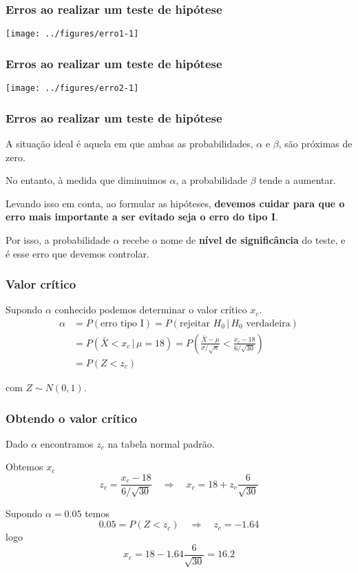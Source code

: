 \documentclass{beamer}
\begin{document}
\begin{frame}
\frametitle{Erros ao realizar um teste de hipótese}

\begin{center}\texttt{[image: ../figures/erro1-1]} \end{center}
\end{frame}

\begin{frame}
\frametitle{Erros ao realizar um teste de hipótese}

\begin{center}\texttt{[image: ../figures/erro2-1]} \end{center}
\end{frame}

\begin{frame}
\frametitle{Erros ao realizar um teste de hipótese}

A situação ideal é aquela em que ambas as probabilidades, \(\alpha\) e
\(\beta\), são próximas de zero.

No entanto, à medida que diminuimos \(\alpha\), a probabilidade
\(\beta\) tende a aumentar.

Levando isso em conta, ao formular as hipóteses, \textbf{devemos cuidar
para que o erro mais importante a ser evitado seja o erro do tipo I}.

Por isso, a probabilidade \(\alpha\) recebe o nome de \textbf{nível de
significância} do teste, e é esse erro que devemos controlar.
\end{frame}

\begin{frame}
\frametitle{Valor crítico}

Supondo \(\alpha\) conhecido podemos determinar o valor crítico \(x_c\).
\begin{align*}
\alpha &= P(\text{erro tipo I}) = P(\text{rejeitar } H_0 \, | \, H_0
\text{ verdadeira}) \\
 &= P(\bar{X} < x_c \, | \, \mu = 18) = P\left( \frac{\bar{X} -
 \mu}{\sigma/\sqrt{n}} < \frac{x_c - 18}{6/\sqrt{30}} \right) \\
 &= P(Z < z_c)
\end{align*}

com \(Z \sim N(0,1)\).
\end{frame}

\begin{frame}
\frametitle{Obtendo o valor crítico}

Dado \(\alpha\) encontramos \(z_c\) na tabela normal padrão.

Obtemos \(x_c\) \[
z_c = \frac{x_c - 18}{6/\sqrt{30}} \quad \Rightarrow \quad x_c = 18 +
z_c \frac{6}{\sqrt{30}}
\]

Supondo \(\alpha = 0.05\) temos \[
0.05 = P(Z < z_c) \quad \Rightarrow \quad z_c = -1.64
\] logo \[
x_c = 18 - 1.64 \frac{6}{\sqrt{30}} = 16.2
\]
\end{frame}
\end{document}
